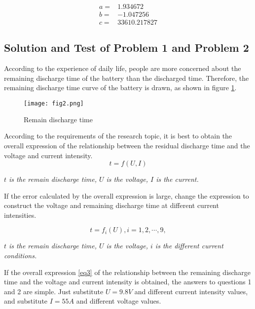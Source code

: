 \documentclass[conference]{IEEEtran}
\begin{document}
\begin{equation}
\begin{aligned}{}
a =& 1.934672\\
b =& - 1.047256\\
c =& 33610.217827
\end{aligned} \label{eq2}
\end{equation}


\subsection{Solution and Test of Problem 1 and Problem 2}

According to the experience of daily life, people are more concerned about the remaining discharge time of the battery than the discharged time. Therefore, the remaining discharge time curve of the battery is drawn, as shown in figure \ref{fig2}.

\begin{figure}[htbp]
	\centerline{\texttt{[image: fig2.png]}}
	\caption{Remain discharge time}
	\label{fig2}
\end{figure}

According to the requirements of the research topic, it is best to obtain the overall expression of the relationship between the residual discharge time and the voltage and current intensity.
\begin{equation}
t = f\left( {U,I} \right) 
\label{eq3}
\end{equation}

 \emph{$t$ is the remain discharge time, $U$ is the voltage, $I$ is the current.}
 
 If the error calculated by the overall expression is large, change the expression to construct the voltage and remaining discharge time at different current intensities.
 
 \begin{equation}
 t = {f_i}\left( U \right),i = 1,2, \cdots ,9, \label{eq4}
 \end{equation}
 
  \emph{$t$ is the remain discharge time, $U$ is the voltage, $i$ is the different current conditions.}
  
  If the overall expression \eqref{eq3} of the relationship between the remaining discharge time and the voltage and current intensity is obtained, the answers to questions 1 and 2 are simple. Just substitute $U=9.8V$ and different current intensity values, and substitute $I=55A$ and different voltage values.    
  
\end{document}
